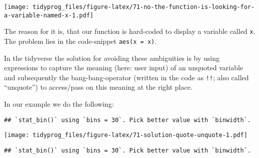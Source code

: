 \documentclass[]{book}
\newenvironment{Shaded}{\begin{snugshade}}{\end{snugshade}}
\newcommand{\CommentTok}[1]{\textcolor[rgb]{0.56,0.35,0.01}{\textit{#1}}}
\newcommand{\ControlFlowTok}[1]{\textcolor[rgb]{0.13,0.29,0.53}{\textbf{#1}}}
\newcommand{\DataTypeTok}[1]{\textcolor[rgb]{0.13,0.29,0.53}{#1}}
\newcommand{\KeywordTok}[1]{\textcolor[rgb]{0.13,0.29,0.53}{\textbf{#1}}}
\newcommand{\NormalTok}[1]{#1}
\newcommand{\OperatorTok}[1]{\textcolor[rgb]{0.81,0.36,0.00}{\textbf{#1}}}
\newcommand{\StringTok}[1]{\textcolor[rgb]{0.31,0.60,0.02}{#1}}
\begin{document}
\texttt{[image: tidyprog\_files/figure-latex/71-no-the-function-is-looking-for-a-variable-named-x-1.pdf]}

The reason for it is, that our function is hard-coded to display a variable called \texttt{x}.
The problem lies in the code-snippet \texttt{aes(x\ =\ x)}.

In the tidyverse the solution for avoiding these ambiguities is by using expressions to capture the meaning (here: user input) of an unquoted variable and subsequently the bang-bang-operator (written in the code as \texttt{!!}; also called ``unquote'') to access/pass on this meaning at the right place.

In our example we do the following:

\begin{Shaded}
\end{Shaded}

\begin{verbatim}
## `stat_bin()` using `bins = 30`. Pick better value with `binwidth`.
\end{verbatim}

\texttt{[image: tidyprog\_files/figure-latex/71-solution-quote-unquote-1.pdf]}

\begin{Shaded}
\end{Shaded}

\begin{verbatim}
## `stat_bin()` using `bins = 30`. Pick better value with `binwidth`.
\end{verbatim}
\end{document}
